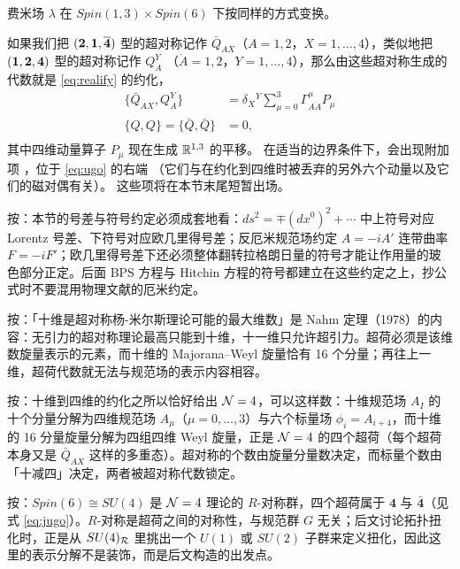  费米场 $\lambda$ 在 $Spin(1,3)\times Spin(6)$ 下按同样的方式变换。

 如果我们把 $({\bf 2},{\bf 1},\bar{\bf 4})$ 型的超对称记作
$\bar Q_{AX}$（$A=1,2$，$X=1,\dots, 4$），类似地把
$({\bf 1},{\bf 2},{\bf  4})$ 型的超对称记作 $ Q_{\dot A }^Y$
（$\dot A=1,2$，$Y=1,\dots,4$），那么由这些超对称生成的代数就是
\eqref{eq:realify} 的约化，
\setcounter{equation}{14}
\begin{equation}\label{eq:ugo}
\begin{aligned}\{\bar Q_{AX}, Q_{\dot A}^
Y\}&=\delta_X{}^Y\sum_{\mu=0}^3\Gamma^\mu_{A\dot A}P_\mu\\
\{Q,Q\}=\{\bar Q,\bar Q\}&=0,\\\end{aligned}
\end{equation}
 其中四维动量算子 $P_\mu$ 现在生成 $\Bbb{R}^{1,3}$ 的平移。
在适当的边界条件下，会出现附加项 \cite{ref13}，位于 \eqref{eq:ugo} 的右端
（它们与在约化到四维时被丢弃的另外六个动量以及它们的磁对偶有关）。
这些项将在本节末尾短暂出场。

\begin{yizhu}[易错点]
按：本节的号差与符号约定必须成套地看：$ds^2=\mp(dx^0)^2+\cdots$ 中上符号对应 Lorentz 号差、下符号对应欧几里得号差；反厄米规范场约定 $A=-iA'$ 连带曲率 $F=-iF'$；欧几里得号差下还必须整体翻转拉格朗日量的符号才能让作用量的玻色部分正定。后面 BPS 方程与 Hitchin 方程的符号都建立在这些约定之上，抄公式时不要混用物理文献的厄米约定。
\end{yizhu}

\begin{yizhu}[含糊点拨]
按：「十维是超对称杨-米尔斯理论可能的最大维数」是 Nahm 定理（1978）的内容：无引力的超对称理论最高只能到十维，十一维只允许超引力。超荷必须是该维数旋量表示的元素，而十维的 Majorana--Weyl 旋量恰有 16 个分量；再往上一维，超荷代数就无法与规范场的表示内容相容。
\end{yizhu}

\begin{yizhu}[物理图像]
按：十维到四维的约化之所以恰好给出 ${\EUN}=4$，可以这样数：十维规范场 $A_I$ 的十个分量分解为四维规范场 $A_\mu$（$\mu=0,\dots,3$）与六个标量场 $\phi_i=A_{i+4}$，而十维的 16 分量旋量分解为四组四维 Weyl 旋量，正是 ${\EUN}=4$ 的四个超荷（每个超荷本身又是 $\bar Q_{AX}$ 这样的多重态）。超对称的个数由旋量分量数决定，而标量个数由「十减四」决定，两者被超对称代数锁定。
\end{yizhu}

\begin{yizhu}[易错点]
按：$Spin(6)\cong SU(4)$ 是 ${\EUN}=4$ 理论的 $R$-对称群，四个超荷属于 $\mathbf{4}$ 与 $\bar{\mathbf{4}}$（见式 \eqref{eq:jugo}）。$R$-对称是超荷之间的对称性，与规范群 $G$ 无关；后文讨论拓扑扭化时，正是从 $SU(4)_{{\cal R}}$ 里挑出一个 $U(1)$ 或 $SU(2)$ 子群来定义扭化，因此这里的表示分解不是装饰，而是后文构造的出发点。
\end{yizhu}

